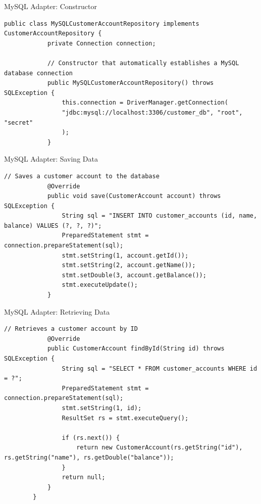 \documentclass[aspectratio=169, table]{beamer}
\begin{document}
\begin{frame}[fragile]{MySQL Adapter: Constructor}
	\vspace{20pt}
	\begin{lstlisting}[style=JavaStyle]
		public class MySQLCustomerAccountRepository implements CustomerAccountRepository {
			private Connection connection;
			
			// Constructor that automatically establishes a MySQL database connection
			public MySQLCustomerAccountRepository() throws SQLException {
				this.connection = DriverManager.getConnection(
				"jdbc:mysql://localhost:3306/customer_db", "root", "secret"
				);
			}
		\end{lstlisting}
	\end{frame}
	
	\begin{frame}[fragile]{MySQL Adapter: Saving Data}
		\vspace{20pt}
		\begin{lstlisting}[style=JavaStyle]
			// Saves a customer account to the database
			@Override
			public void save(CustomerAccount account) throws SQLException {
				String sql = "INSERT INTO customer_accounts (id, name, balance) VALUES (?, ?, ?)";
				PreparedStatement stmt = connection.prepareStatement(sql);
				stmt.setString(1, account.getId());
				stmt.setString(2, account.getName());
				stmt.setDouble(3, account.getBalance());
				stmt.executeUpdate();
			}
		\end{lstlisting}
	\end{frame}
	
	\begin{frame}[fragile]{MySQL Adapter: Retrieving Data}
		\vspace{20pt}
		\begin{lstlisting}[style=JavaStyle]
			// Retrieves a customer account by ID
			@Override
			public CustomerAccount findById(String id) throws SQLException {
				String sql = "SELECT * FROM customer_accounts WHERE id = ?";
				PreparedStatement stmt = connection.prepareStatement(sql);
				stmt.setString(1, id);
				ResultSet rs = stmt.executeQuery();
				
				if (rs.next()) {
					return new CustomerAccount(rs.getString("id"), rs.getString("name"), rs.getDouble("balance"));
				}
				return null;
			}
		}
	\end{lstlisting}
\end{frame}
\end{document}
